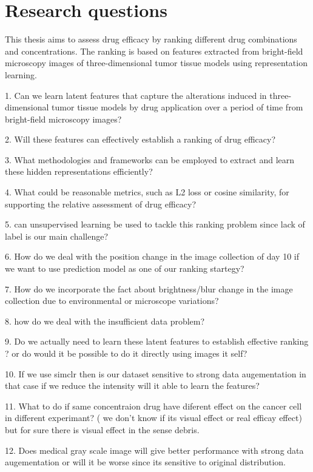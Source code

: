 \chapter{Research questions}\label{ch:Research questions}
This thesis aims to assess drug efficacy by ranking different drug combinations and concentrations. 
The ranking is based on features extracted from bright-field microscopy images of  three-dimensional tumor tissue models using
representation learning. 

1. Can we learn latent features that capture the alterations 
induced in three-dimensional tumor tissue models by drug application over a period of time from bright-field microscopy images?

2.  Will these features can effectively establish a ranking of drug efficacy?

3. What methodologies and frameworks can be employed to extract and learn these
 hidden representations efficiently?

4. What could be reasonable metrics, such as L2 loss or cosine similarity, for 
supporting the relative assessment of drug efficacy?

5. can unsupervised learning be used to tackle this ranking problem since lack of label is 
our main challenge?

6. How do we deal with the position change in the image collection of day 10 if we want to use prediction 
model as one of our ranking startegy?

7. How do we incorporate the fact about brightness/blur change in the image collection due to environmental or microscope 
variations?

8. how do we deal with the insufficient data problem?

9. Do we actually need to learn these latent features to establish effective ranking ? or do would it be possible to do it directly using images it self?

10. If we use simclr then is our dataset sensitive to strong data augementation in that case if we reduce the intensity will it able to learn the features?

11. What to do if same concentraion drug have diferent effect on the cancer cell in different experimant? ( we don't know if its visual effect or real efficay effect)
but for sure there is visual effect in the sense debris. 

12. Does medical gray scale image will give better performance with  strong data augementation or will it be worse since its sensitive to original distribution.
